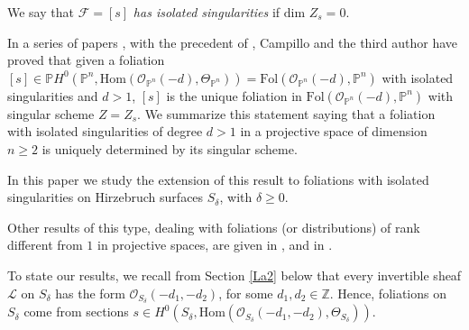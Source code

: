 \documentclass{amsart} %
\theoremstyle{definition}
\newcommand{\cts}{\Theta_{S_{\delta}}}
\newcommand{\cs}{S_{\delta}}
\newcommand{\PP}{\mathbb{P}}
\newcommand{\mcL}{\mathcal{L}}
\newcommand{\mcO}{\mathcal{O}}
\newcommand{\mcF}{\mathcal{F}}
\begin{document}
We say that $ \mcF = [s] $ \emph{has isolated singularities} if
$ \text{dim } Z_s = 0 $.

In a series of papers \cite{Cam-Oli-1, Cam-Oli, Cam-Oli-2}, with the precedent of \cite{GM-2},
Campillo and the third author have proved that given a foliation
$ [s] \in \PP H^0( \PP^n, \mathrm{Hom}( \mcO_{\PP^n}( -d ), \Theta_{\PP^n} ) )
 = \mathrm{Fol}( \mcO_{\PP^n}( -d ), \PP^n ) $
 with isolated singularities and $ d > 1 $,
 $ [s] $ is the unique foliation in $\mathrm{Fol} ( \mcO_{\PP^n}( -d ), \PP^n ) $
 with singular scheme $ Z = Z_s $. We summarize this statement saying that a foliation with isolated
 singularities of degree $ d > 1 $ in a projective space of dimension $ n \geq 2 $ is uniquely
 determined by its singular scheme.

In this paper we study the extension of this result to foliations with isolated singularities %
on Hirzebruch surfaces $ S_{\delta} $, with $ \delta \geq 0 $.

Other results of this type,
dealing with foliations (or distributions)
of rank different from $1$ in projective spaces, are given in
\cite{A-C}, \cite{C-F-N-V} and in \cite{G-P}.

To state our results, we recall from Section \ref{La2}  below that every invertible sheaf
$ \mcL $ on $ \cs $ has the form $\mcO_{\cs} (-d_1,-d_2) $, for some $ d_1, d_2 \in \mathbb{Z}$. Hence,
foliations on $ \cs $ come from sections $ s \in H^0( \cs, \mathrm{Hom} (\mcO_{\cs} (-d_1,-d_2), \cts ) ) $.
\end{document}
